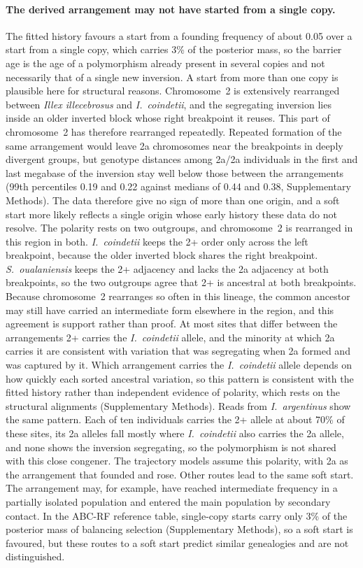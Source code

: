 \documentclass[11pt]{article}
\newcommand{\illex}{\textit{Illex illecebrosus}}
\newcommand{\coin}{\textit{I.\ coindetii}}
\begin{document}
\paragraph{The derived arrangement may not have started from a single copy.}
The fitted history favours a start from a founding frequency of about 0.05 over a start from a single copy, which
carries 3\% of the posterior mass, so the barrier age is the age of a polymorphism already present in several copies
and not necessarily that of a single new inversion. A start from more than one copy is plausible here for structural reasons. Chromosome~2 is extensively
rearranged between \illex{} and \coin{}, and the segregating inversion lies inside an older inverted block whose
right breakpoint it reuses. This part of chromosome~2 has therefore rearranged repeatedly. Repeated formation of the same arrangement would leave 2a chromosomes near the breakpoints in deeply divergent groups, but genotype distances among 2a/2a individuals in the first and last megabase of the inversion stay well below those between the arrangements (99th percentiles 0.19 and 0.22 against medians of 0.44 and 0.38, Supplementary Methods). The data therefore give no sign of more than one origin, and a soft start more likely reflects a single origin whose early history these data do not resolve.
The polarity rests on two outgroups, and chromosome~2 is rearranged in this region in both. \coin{} keeps the 2+ order only across the left breakpoint, because the older inverted block shares the right breakpoint. \textit{S.~oualaniensis} keeps the 2+ adjacency and lacks the 2a adjacency at both breakpoints, so the two outgroups agree that 2+ is ancestral at both breakpoints. Because chromosome~2 rearranges so often in this lineage, the common ancestor may still have carried an intermediate form elsewhere in the region, and this agreement is support rather than proof. At most sites that differ between the arrangements 2+ carries the \coin{} allele, and the minority at which 2a carries it are consistent with variation that was segregating when 2a formed and was captured by it. Which arrangement carries the \coin{} allele depends on how quickly each sorted ancestral variation, so this pattern is consistent with the fitted history rather than independent evidence of polarity, which rests on the structural alignments (Supplementary Methods). Reads from \textit{I.\ argentinus} show the same pattern. Each of ten individuals carries the 2+ allele at about 70\% of these sites, its 2a alleles fall mostly where \coin{} also carries the 2a allele, and none shows the inversion segregating, so the polymorphism is not shared with this close congener. The trajectory models assume this polarity, with 2a as the arrangement that founded and rose.
Other routes lead to the same soft start. The arrangement may, for example, have reached intermediate
frequency in a partially isolated population and entered the main population by secondary contact. In the ABC-RF reference table, single-copy starts carry only 3\% of the posterior mass of balancing selection (Supplementary Methods), so a soft start is favoured, but these routes to a soft start predict similar genealogies and are not distinguished.
\end{document}
